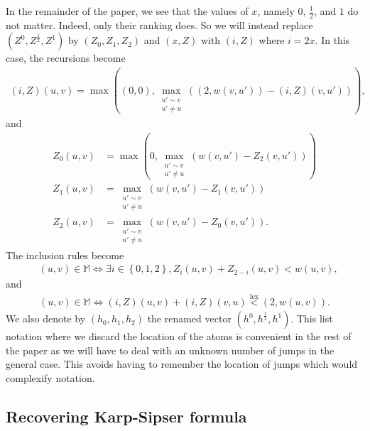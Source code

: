 \documentclass[11pt]{article}
\DeclareMathOperator{\lex}{lex}
\begin{document}
In the remainder of the paper, we see that the values of $x$, namely $0$, $\frac{1}{2}$, and $1$ do not matter. Indeed, only their ranking does. So we will instead replace $(Z^0,Z^\frac{1}{2},Z^1)$ by $(Z_0,Z_1,Z_2)$ and $(x,Z)$ with $(i,Z)$ where $i=2x$. In this case, the recursions become
\begin{equation}
    \begin{aligned}
        (i,Z)(u,v)=\max\left( (0,0) , \max_{\substack{ u' \sim v \\ u' \neq u}}\left( (2,w(v,u'))-(i,Z)(v,u') \right) \right),
    \end{aligned}
\end{equation}
and
\begin{equation}\label{eq:recursionZlist2}
\begin{aligned}
    Z_0(u,v) &=  \max\left(0,\max_{\substack{ u' \sim v \\ u' \neq u}}\left( w(v,u')-Z_2(v,u') \right)\right) \\
    Z_{1}(u,v) &= \max_{\substack{ u' \sim v \\ u' \neq u}}\left( w(v,u')-Z_1(v,u') \right) \\
    Z_2(u,v) &= \max_{\substack{ u' \sim v \\ u' \neq u}}\left( w(v,u')-Z_0(v,u') \right).
\end{aligned}
\end{equation}
The inclusion rules become
\begin{align}
    &(u,v) \in \mathbb{M} \Leftrightarrow \exists i \in \left\{0,1,2\right\} , Z_{i}(u,v)+Z_{2-i}(u,v) < w(u,v),
\end{align}
and
\begin{align}
    (u,v) \in \mathbb{M} \Leftrightarrow (i,Z)(u,v)+(i,Z)(v,u) \overset{\mathrm{\lex}}{<} (2,w(u,v)).
\end{align}
We also denote by $(h_0,h_1,h_2)$ the renamed vector $(h^0,h^{\frac{1}{2}},h^1)$. This list notation where we discard the location of the atoms is convenient in the rest of the paper as we will have to deal with an unknown number of jumps in the general case. This avoids having to remember the location of jumps which would complexify notation.



\subsection{Recovering Karp-Sipser formula}
\end{document}
